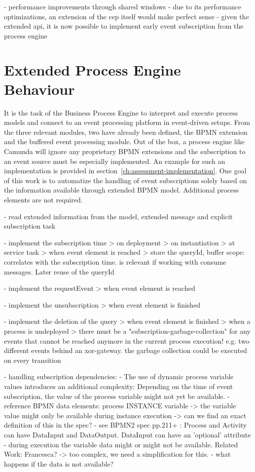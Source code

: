 
- performance improvements through shared windows
- due to its performance optimizations, an extension of the cep itself would make perfect sense
- given the extended api, it is now possible to implement early event subscription from the process engine 


\section{Extended Process Engine Behaviour}\label{ch:extendedprocessengine}
It is the task of the Business Process Engine to interpret and execute process models and connect to an event processing platform in event-driven setups.
From the three relevant modules, two have already been defined, the BPMN extension and the buffered event processing module.
Out of the box, a process engine like Camunda will ignore any proprietary BPMN extensions and the subscription to an event source must be especially implemented. An example for such an implementation is provided in section~\autoref{ch:assessment-implementation}.
One goal of this work is to automatize the handling of event subscriptions solely based on the information available through extended BPMN model. Additional process elements are not required.

- read extended information from the model, extended message and explicit subscription task

- implement the subscription time
> on deployment
> on instantiation
> at service task
> when event element is reached
> store the queryId, buffer scope: correlates with the subscription time. is relevant if working with consume messages. Later reuse of the queryId

- implement the requestEvent
> when event element is reached

- implement the unsubscription
> when event element is finished

- implement the deletion of the query
> when event element is finished
> when a process is undeployed
> there must be a "subscription-garbage-collection" for any events that cannot be reached anymore in the current process execution! e.g. two different events behind an xor-gateway. the garbage collection could be executed on every transition


- handling subscription dependencies:
- The use of dynamic process variable values introduces an additional complexity: Depending on the time of event subscription, the value of the process variable might not yet be available.
- reference BPMN data elements: process INSTANCE variable
-> the variable value might only be available during instance execution
-> can we find an exact definition of this in the spec?
- see BPMN2 spec pp.211+ : Process and Activity can have DataInput and DataOutput. DataInput can have an 'optional' attribute
- during execution the variable data might or might not be available. Related Work: Francesca?
-> too complex, we need a simplification for this.
- what happens if the data is not available?

